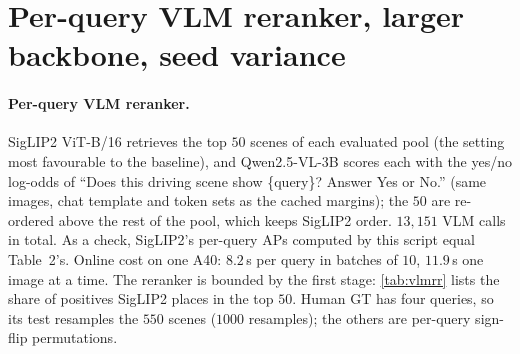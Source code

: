 \documentclass[10pt,letterpaper]{article}
\begin{document}
\begin{table}[H]\centering\small
\caption{\textbf{External transfer}, BDD100K: $1000$ images, $12$ queries,
native human labels, chance $0.262$. In-vocabulary: the $4$ queries naming a
cached attribute (fixed from wording). BDD100K has no metadata, so
$s_{\mathrm{abst}}$ is the SigLIP2 cosine. No tuning on BDD100K.}
\label{tab:bdd}
\resizebox{0.6\textwidth}{!}{%
%
}
\end{table}

\begin{table}[H]\centering\small
\caption{\textbf{Ablations of SceneMiner}, one inference switch each (``--'': switch not applicable on BDD100K).}
\label{tab:abl}
\resizebox{0.6\textwidth}{!}{%
%
}
\end{table}

\begin{table}[H]\centering\small
\caption{\textbf{150-query suite} by stratum, $602$ evaluation scenes. Relevance
is cached attributes and metadata (main paper, Sec.~3.1); the index is a ceiling.}
\label{tab:suite}
\resizebox{0.6\textwidth}{!}{%
%
}
\end{table}

\section{Per-query VLM reranker, larger backbone, seed variance}

\paragraph{Per-query VLM reranker.} SigLIP2 ViT-B/16 retrieves the top $50$ scenes of
each evaluated pool (the setting most favourable to the baseline), and Qwen2.5-VL-3B
scores each with the yes/no log-odds of ``Does this driving scene show
\{query\}? Answer Yes or No.'' (same images, chat template and token sets as the
cached margins); the $50$ are re-ordered above the rest of the pool, which keeps
SigLIP2 order. $13{,}151$ VLM calls in total. As a check, SigLIP2's per-query APs
computed by this script equal Table~2's. Online cost on one A40: $8.2$\,s per query
in batches of $10$, $11.9$\,s one image at a time. The reranker is bounded by the
first stage: \cref{tab:vlmrr} lists the share of positives SigLIP2 places in the top
$50$. Human GT has four queries, so its test resamples the $550$ scenes ($1000$
resamples); the others are per-query sign-flip permutations.
\end{document}
